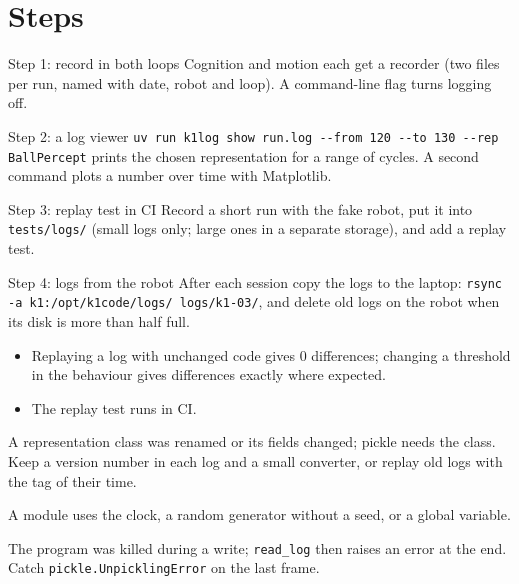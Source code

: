 \section*{Steps}
\begin{stepbox}{Step 1: record in both loops}
Cognition and motion each get a recorder (two files per run, named with date, robot and loop). A command-line flag turns logging off.
\end{stepbox}
\begin{stepbox}{Step 2: a log viewer}
\verb!uv run k1log show run.log --from 120 --to 130 --rep BallPercept! prints the chosen representation for a range of cycles. A second command plots a number over time with Matplotlib.
\end{stepbox}
\begin{stepbox}{Step 3: replay test in CI}
Record a short run with the fake robot, put it into \texttt{tests/logs/} (small logs only; large ones in a separate storage), and add a replay test.
\end{stepbox}
\begin{stepbox}{Step 4: logs from the robot}
After each session copy the logs to the laptop: \verb!rsync -a k1:/opt/k1code/logs/ logs/k1-03/!, and delete old logs on the robot when its disk is more than half full.
\end{stepbox}

\begin{checkbox}
\begin{itemize}[nosep]
  \item Replaying a log with unchanged code gives $0$ differences; changing a threshold in the behaviour gives differences exactly where expected.
  \item The replay test runs in CI.
\end{itemize}
\end{checkbox}

\begin{troublebox}
\begin{description}[leftmargin=0.6cm,nosep]
  \item[\texttt{AttributeError} when loading an old log] A representation class was renamed or its fields changed; pickle needs the class. Keep a version number in each log and a small converter, or replay old logs with the tag of their time.
  \item[Replay differs although nothing changed] A module uses the clock, a random generator without a seed, or a global variable.
  \item[The log is cut off] The program was killed during a write; \texttt{read\_log} then raises an error at the end. Catch \texttt{pickle.UnpicklingError} on the last frame.
\end{description}
\end{troublebox}

